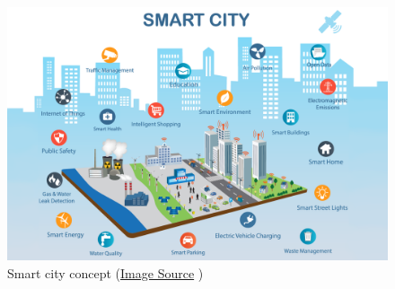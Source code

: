 \documentclass[17pt]{report}
\begin{document}
\begin{figure}[h!]
    \includegraphics[width=\textwidth]{SmartCity.png}
    \caption{Smart city concept 
    (\href{https://aliga.sk/en/what-the-heck-is-a-smart-city/}{Image Source} \textcopyright)}
    \label{fig:SmartCity}
\end{figure}
\end{document}
